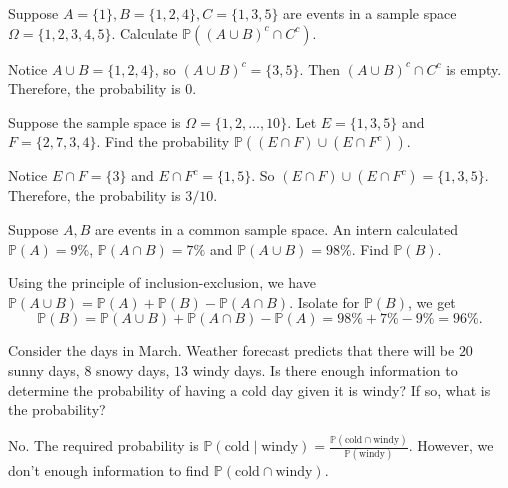 \documentclass[../main.tex]{subfiles}
\begin{document}
\begin{exercise}
  Suppose \(A = \{1\}, B = \{1,2,4\}, C = \{1,3,5\}\) are events in a sample space \(\Omega = \{1,2,3,4,5\}\). Calculate \(\mathbb{P}( (A \cup B)^{c} \cap C^{c} )\).

  \begin{solution}
    Notice \(A \cup B = \{ 1,2,4\}\), so \((A \cup B)^{c} = \{3,5\}\).  Then \((A \cup B)^{c} \cap C^{c}\) is empty. Therefore, the probability is \(0\).
  \end{solution}
\end{exercise}

\begin{exercise}
  Suppose the sample space is \(\Omega = \{1,2,\ldots,10\}\).  Let \(E = \{1,3,5\}\) and \(F = \{2,7,3,4\}\). Find the probability \(\mathbb{P}( (E \cap F) \cup (E \cap F^{c})) \).

  \begin{solution}
    Notice \(E \cap F = \{ 3\}\) and \(E \cap F^{c} = \{1,5\}\). So \((E \cap F) \cup (E \cap F^{c}) = \{1,3,5\}\). Therefore, the probability is \(3/10\).
  \end{solution}
\end{exercise}

\begin{exercise}
  Suppose \(A,B\) are events in a common sample space. An intern calculated \(\mathbb{P}(A) = 9\%\), \(\mathbb{P}(A \cap B) = 7\%\) and \(\mathbb{P}(A \cup B) = 98\%\). Find \(\mathbb{P}(B)\).

  \begin{solution}
    Using the principle of inclusion-exclusion, we have \(\mathbb{P}(A \cup B) = \mathbb{P}(A) + \mathbb{P}(B) - \mathbb{P}(A \cap B)\). Isolate for \(\mathbb{P}(B)\), we get
    \[
      \mathbb{P}(B) = \mathbb{P}(A \cup B) + \mathbb{P}(A \cap B) - \mathbb{P}(A) = 98\% + 7\% - 9\% = 96\%.
    \]

  \end{solution}
\end{exercise}

\begin{exercise}
  Consider the days in March. Weather forecast predicts that there will be \(20\) sunny days, \(8\) snowy days, \(13\) windy days. Is there enough information to determine the probability of having a cold day given it is windy? If so, what is the probability?

  \begin{solution}
  No. The required probability is \(\mathbb{P}( \text{cold} \mid \text{windy} ) = \frac{\mathbb{P}(\text{cold} \cap \text{windy})}{\mathbb{P}(\text{windy})}\). However, we don't enough information to find \(\mathbb{P}(\text{cold} \cap \text{windy})\).
  \end{solution}
\end{exercise}
\end{document}
